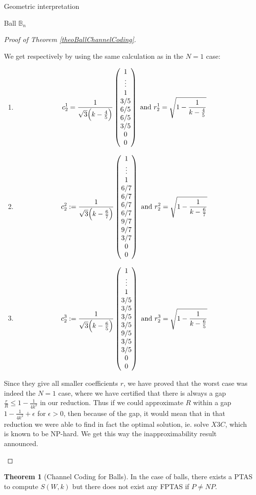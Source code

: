 \documentclass{article}
\theoremstyle{definition}
\newtheorem{theo}{Theorem}[section]
\theoremstyle{remark}
\begin{document}
\begin{subsection}{Geometric interpretation}
\begin{subsubsection}{Ball $\mathbb{B}_n$}
\begin{proof}[Proof of Theorem \ref{theoBallChannelCoding}]
\begin{itemize}
      We get respectively by using the same calculation as in the $N=1$ case:
      \begin{enumerate}
           \item \[c_2^1 = \frac{1}{\sqrt{3}\Big(k-\frac{4}{5}\Big)}\pmqty{1\\\vdots\\1\\3/5\\6/5\\6/5\\3/5\\0\\0} \text{ and } r_2^1 = \sqrt{1-\frac{1}{k-\frac{4}{5}}}\]
           \item \[c_2^2 := \frac{1}{\sqrt{3}\Big(k-\frac{6}{7}\Big)}\pmqty{1\\\vdots\\1\\6/7\\6/7\\6/7\\6/7\\9/7\\9/7\\3/7\\0\\0} \text{ and } r_2^2 = \sqrt{1-\frac{1}{k-\frac{6}{7}}}\]
           \item \[c_2^3 := \frac{1}{\sqrt{3}\Big(k-\frac{6}{5}\Big)}\pmqty{1\\\vdots\\1\\3/5\\3/5\\3/5\\3/5\\9/5\\3/5\\3/5\\0\\0} \text{ and } r_2^3 = \sqrt{1-\frac{1}{k-\frac{6}{5}}}\]
      \end{enumerate}

      Since they give all smaller coefficients $r$, we have proved that the worst case was indeed the $N=1$ case, where we have certified that there is always a gap $\frac{r}{R} \leq 1 - \frac{1}{4k^2}$ in our reduction. Thus if we could approximate $R$ within a gap $1 - \frac{1}{4k^2} + \epsilon$ for $\epsilon > 0$, then because of the gap, it would mean that in that reduction we were able to find in fact the optimal solution, ie. solve $X3C$, which is known to be NP-hard. We get this way the inapproximability result announced.
    \end{itemize}
  \end{proof}
  
  \begin{theo}[Channel Coding for Balls]
    In the case of balls, there exists a PTAS to compute $S(W,k)$ but there does not exist any FPTAS if $P \not=NP$.
  \end{theo}
\end{subsubsection}
\end{subsection}

\newpage



\end{document}
